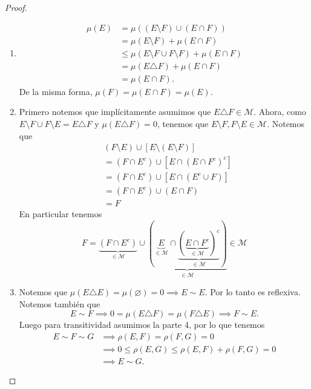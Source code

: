 \documentclass{article}
\theoremstyle{definition}
\theoremstyle{remark}
\numberwithin{equation}{section}
\newcommand{\M}{\mathcal{M}}
\newcommand{\cor}[1]{\left[ #1 \right]}
\begin{document}
\begin{proof}
  \ \begin{enumerate}
    \item 
    \begin{align*}
        \mu(E) &= \mu((E \setminus F) \cup (E \cap F)) \\
        &= \mu(E \setminus F) + \mu(E \cap F) \\
        &\leq \mu(E \setminus F \cup F \setminus F) + \mu(E \cap F) \\
        &= \mu(E \triangle F) + \mu(E \cap F) \\
        &= \mu(E \cap F).
    \end{align*}
    De la misma forma, $\mu(F) = \mu(E \cap F) = \mu(E)$.

    \item Primero notemos que implícitamente asumimos que $E \triangle F \in \M$. Ahora, como $E \setminus F \cup F \setminus E = E \triangle F$ y $\mu(E \triangle F) = 0$, tenemos que $E \setminus F, F \setminus E \in \M$. Notemos que 
    \begin{align*}
        &(F \setminus E) \cup \cor{E \setminus (E \setminus F)} \\
        &= (F \cap E^c) \cup \cor{E \cap (E \cap F^c)^c} \\
        &= (F \cap E^c) \cup \cor{E \cap (E^c \cup F)} \\
        &= (F \cap E^c) \cup (E \cap F) \\
        &= F
    \end{align*}
    En particular tenemos 
    \[ F = \underbrace{(F \cap E^c)}_{\in\M} \cup \underbrace{(\underbrace{E}_{\in\M} \cap \underbrace{(\underbrace{E \cap F^c}_{\in\M})^c}_{\in\M})}_{\in\M} \in \M \]

    \item Notemos que $\mu(E \triangle E) = \mu(\varnothing) = 0 \implies E \sim E$. Por lo tanto es reflexiva. Notemos también que 
    \[ E \sim F \implies 0 = \mu(E \triangle F) = \mu(F \triangle E) \implies F \sim E. \]
    Luego para transitividad asumimos la parte 4, por lo que tenemos 
    \begin{align*}
        E \sim F \sim G
        &\implies \rho(E,F) = \rho(F,G) = 0  \\
        &\implies 0 \leq \rho(E,G) \leq \rho(E,F) + \rho(F,G) = 0 \\
        &\implies E \sim G.
    \end{align*}
    

\end{enumerate}
\end{proof}
\end{document}
